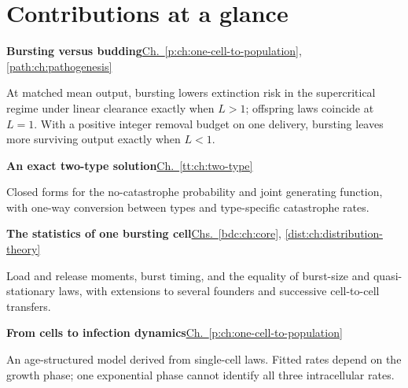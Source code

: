 \chapter*{Contributions at a glance}
\label{oi:summary}
\label{oi:summary-redesigned}
\begingroup
\setlength{\parindent}{0pt}
\setlength{\parskip}{0pt}
\newcommand{\oimapchapter}[2]{\hyperref[#1]{#2}}
\newcommand{\oimapentry}[3]{%
  \begin{minipage}{\linewidth}
    \textbf{#1}\hfill{\small #2}\par
    \vspace{3pt}
    {\small\raggedright #3\par}
  \end{minipage}\par\vspace{13pt}}

\oimapentry{Bursting versus budding}
  {\oimapchapter{p:ch:one-cell-to-population}{Ch.~\ref*{p:ch:one-cell-to-population}},
   \oimapchapter{path:ch:pathogenesis}{\ref*{path:ch:pathogenesis}}}
  {At matched mean output, bursting lowers extinction risk in the
   supercritical regime under linear clearance exactly when $L>1$;
   offspring laws coincide at $L=1$. With a positive integer removal
   budget on one delivery, bursting leaves more surviving output
   exactly when $L<1$.}

\oimapentry{An exact two-type solution}
  {\oimapchapter{tt:ch:two-type}{Ch.~\ref*{tt:ch:two-type}}}
  {Closed forms for the no-catastrophe probability and joint generating
   function, with one-way conversion between types and type-specific
   catastrophe rates.}

\oimapentry{The statistics of one bursting cell}
  {\oimapchapter{bdc:ch:core}{Chs.~\ref*{bdc:ch:core}},
   \oimapchapter{dist:ch:distribution-theory}{\ref*{dist:ch:distribution-theory}}}
  {Load and release moments, burst timing, and the equality of burst-size
   and quasi-stationary laws, with extensions to several founders and
   successive cell-to-cell transfers.}

\oimapentry{From cells to infection dynamics}
  {\oimapchapter{p:ch:one-cell-to-population}{Ch.~\ref*{p:ch:one-cell-to-population}}}
  {An age-structured model derived from single-cell laws. Fitted rates
   depend on the growth phase; one exponential phase cannot identify
   all three intracellular rates.}

